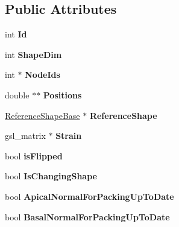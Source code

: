 \subsection*{Public Attributes}
\begin{DoxyCompactItemize}
\item 
\hypertarget{classShapeBase_ae097764dd4d607b54710d7ca0f7e12f8}{}int {\bfseries Id}\label{classShapeBase_ae097764dd4d607b54710d7ca0f7e12f8}

\item 
\hypertarget{classShapeBase_a4d740b60433d7a9104c2d09b0d52703d}{}int {\bfseries Shape\+Dim}\label{classShapeBase_a4d740b60433d7a9104c2d09b0d52703d}

\item 
\hypertarget{classShapeBase_a870e519202c84ef5a81fd35b059fdebe}{}int $\ast$ {\bfseries Node\+Ids}\label{classShapeBase_a870e519202c84ef5a81fd35b059fdebe}

\item 
\hypertarget{classShapeBase_ad6aa109b1f9c10680a0b601452bc78c2}{}double $\ast$$\ast$ {\bfseries Positions}\label{classShapeBase_ad6aa109b1f9c10680a0b601452bc78c2}

\item 
\hypertarget{classShapeBase_a4aee3861aaca88cf1b8e5bdc1ff7c872}{}\hyperlink{classReferenceShapeBase}{Reference\+Shape\+Base} $\ast$ {\bfseries Reference\+Shape}\label{classShapeBase_a4aee3861aaca88cf1b8e5bdc1ff7c872}

\item 
\hypertarget{classShapeBase_a4bda00f80968d836c647afe5f6d1fb36}{}gsl\+\_\+matrix $\ast$ {\bfseries Strain}\label{classShapeBase_a4bda00f80968d836c647afe5f6d1fb36}

\item 
\hypertarget{classShapeBase_a3da6d64116b5d73e2bb27d378035df41}{}bool {\bfseries is\+Flipped}\label{classShapeBase_a3da6d64116b5d73e2bb27d378035df41}

\item 
\hypertarget{classShapeBase_a994acea5e6f2cf92c94f485e7ba5afc9}{}bool {\bfseries Is\+Changing\+Shape}\label{classShapeBase_a994acea5e6f2cf92c94f485e7ba5afc9}

\item 
\hypertarget{classShapeBase_ac2bab1161a08d0d953702b7c8d1ff032}{}bool {\bfseries Apical\+Normal\+For\+Packing\+Up\+To\+Date}\label{classShapeBase_ac2bab1161a08d0d953702b7c8d1ff032}

\item 
\hypertarget{classShapeBase_a189180583fb224af63900411b2da53c6}{}bool {\bfseries Basal\+Normal\+For\+Packing\+Up\+To\+Date}\label{classShapeBase_a189180583fb224af63900411b2da53c6}


\end{DoxyCompactItemize}
